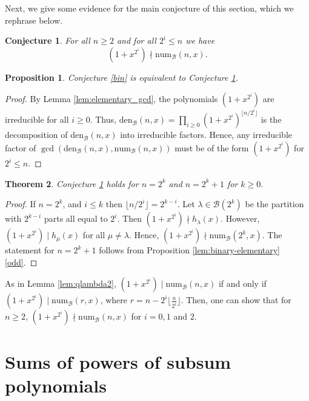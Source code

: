 \documentclass[reqno]{amsart}
\def\den{\mathrm{den}}
\def\num{\mathrm{num}}
\def\B{\mathcal{B}}
\newtheorem{theorem}{Theorem}[section]
\newtheorem{proposition}[theorem]{Proposition}
\newtheorem{conjecture}{Conjecture}
\theoremstyle{definition}
\begin{document}
Next, we give some evidence for the main conjecture of this section, which we rephrase below.
\begin{conjecture}\label{conj:no_primitive_2tothe_ith_root}
    For all $n\geq 2$  and for  all $2^i\leq n$ we have
    \[(1+x^{2^i})\nmid \num_{\mathcal B}(n,x).\]
\end{conjecture}

\begin{proposition}
    Conjecture \ref{bin} is equivalent to  Conjecture \ref{conj:no_primitive_2tothe_ith_root}.
\end{proposition}
\begin{proof}
    By Lemma \ref{lem:elementary_gcd}, the polynomials $(1+x^{2^i})$ are irreducible for all $i\geq 0$.
Thus, $\den_{\mathcal B}(n,x)=\prod_{i\geq 0}(1+x^{2^i})^{\lfloor n/2^i\rfloor}$ is the decomposition of $\den_{\mathcal B}(n,x)$ into irreducible factors. Hence, any irreducible factor of $\gcd(\den_{\B}(n,x),\num_{\B}(n,x))$
 must be of the form $(1+x^{2^i})$ for $2^i\leq n$.
\end{proof}


\begin{theorem}
Conjecture     \ref{conj:no_primitive_2tothe_ith_root} holds for $n=2^k$ and $n=2^k+1$ for $k\geq 0.$
\end{theorem}
\begin{proof} If $n=2^k$, and $i\leq k$ then $\lfloor n/2^i\rfloor=2^{k-i}$. Let $\lambda\in\B(2^k)$ be the partition with $2^{k-i}$ parts all equal to $2^i$.  Then $(1+x^{2^i})\nmid h_\lambda(x)$.  However, $(1+x^{2^i})\mid h_{\mu}(x)$ for all $\mu\neq\lambda$. Hence, $(1+x^{2^i})\nmid\num_{\B}(2^k,x)$. The statement for  $n=2^k+1$ follows from Proposition \ref{lem:binary-elementary} \ref{odd}.
\end{proof}

 As in Lemma \ref{lem:qlambda2},  $(1+x^{2^i})\mid \num_\B(n,x)$ if and only if $(1+x^{2^i})\mid \num_\B(r,x)$, where $r=n-2^i\lfloor \frac{n}{2^i}\rfloor$. Then,  one can show that for $n\geq 2$, $(1+x^{2^i})\nmid \num_\B(n,x)$ for $i=0, 1$ and $2$.











\section{Sums of powers of subsum polynomials } \label{sec:gen_sums}
\end{document}

